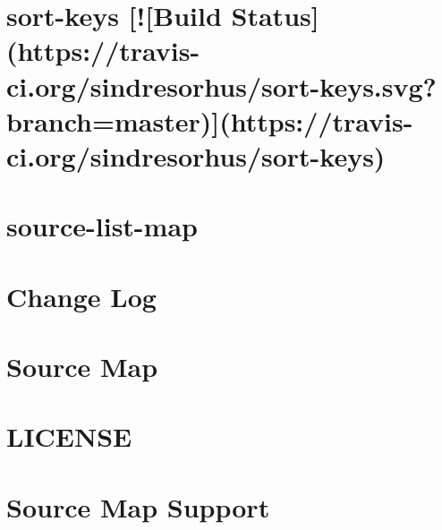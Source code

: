 \documentclass[twoside]{book}
\newcommand{\+}{\discretionary{\mbox{\scriptsize$\hookleftarrow$}}{}{}}
\begin{document}
\chapter{sort-\/keys \mbox{[}!\mbox{[}Build Status\mbox{]}(https\+://travis-\/ci.org/sindresorhus/sort-\/keys.svg?branch=master)\mbox{]}(https\+://travis-\/ci.org/sindresorhus/sort-\/keys)}
\label{md__c_1_workspace_demo_src_main_script_node_modules_sort-keys_readme}

\chapter{source-\/list-\/map}
\label{md__c_1_workspace_demo_src_main_script_node_modules_source-list-map__r_e_a_d_m_e}

\chapter{Change Log}
\label{md__c_1_workspace_demo_src_main_script_node_modules_source-map__c_h_a_n_g_e_l_o_g}

\chapter{Source Map}
\label{md__c_1_workspace_demo_src_main_script_node_modules_source-map__r_e_a_d_m_e}

\chapter{L\+I\+C\+E\+N\+SE}
\label{md__c_1_workspace_demo_src_main_script_node_modules_source-map-support__l_i_c_e_n_s_e}

\chapter{Source Map Support}
\label{md__c_1_workspace_demo_src_main_script_node_modules_source-map-support__r_e_a_d_m_e}

\end{document}
